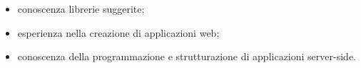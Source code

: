 \begin{itemize}
    \item conoscenza librerie suggerite;
    \item esperienza nella creazione di applicazioni web;
    \item conoscenza della programmazione e strutturazione di applicazioni server-side.
\end{itemize}